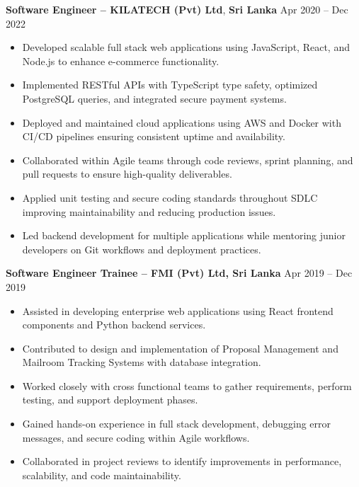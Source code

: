 \documentclass[10pt,letterpaper]{article}
\begin{document}
\vspace{-2pt}

\textbf{Software Engineer -- KILATECH (Pvt) Ltd}, \textbf{Sri Lanka} \hfill Apr 2020 -- Dec 2022

\vspace{-1pt}

\begin{itemize}
\item Developed scalable full stack web applications using JavaScript, React, and Node.js to enhance e-commerce functionality.
\item Implemented RESTful APIs with TypeScript type safety, optimized PostgreSQL queries, and integrated secure payment systems.
\item Deployed and maintained cloud applications using AWS and Docker with CI/CD pipelines ensuring consistent uptime and availability.
\item Collaborated within Agile teams through code reviews, sprint planning, and pull requests to ensure high-quality deliverables.
\item Applied unit testing and secure coding standards throughout SDLC improving maintainability and reducing production issues.
\item Led backend development for multiple applications while mentoring junior developers on Git workflows and deployment practices.
\end{itemize}

\textbf{Software Engineer Trainee -- FMI (Pvt) Ltd, Sri Lanka} \hfill Apr 2019 -- Dec 2019

\vspace{-1pt}

\begin{itemize}
\item Assisted in developing enterprise web applications using React frontend components and Python backend services.
\item Contributed to design and implementation of Proposal Management and Mailroom Tracking Systems with database integration.
\item Worked closely with cross functional teams to gather requirements, perform testing, and support deployment phases.
\item Gained hands-on experience in full stack development, debugging error messages, and secure coding within Agile workflows.
\item Collaborated in project reviews to identify improvements in performance, scalability, and code maintainability.
\end{itemize}
\end{document}
